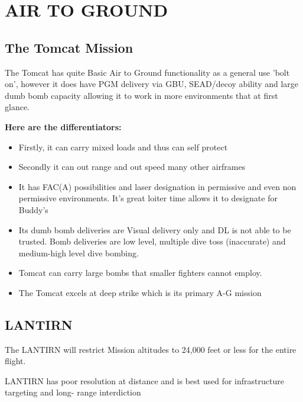 \section{AIR TO GROUND}

\subsection{The Tomcat Mission}

The Tomcat has quite Basic Air to Ground functionality as a general use 'bolt
on', however it does have PGM delivery via GBU, SEAD/decoy ability and large
dumb bomb capacity allowing it to work in more environments that at first
glance.

\textbf{Here are the differentiators:}

\begin{itemize}

  \item Firstly, it can carry mixed loads and thus can self protect

  \item Secondly it can out range and out speed many other airframes

  \item It has FAC(A) possibilities and laser designation in permissive and
    even non permissive environments. It's great loiter time allows it to
    designate for Buddy's

  \item Its dumb bomb deliveries are Visual delivery only and DL is not able to
    be trusted. Bomb deliveries are low level, multiple dive toss (inaccurate)
    and medium-high level dive bombing.

  \item Tomcat can carry large bombs that smaller fighters cannot employ.

  \item The Tomcat excels at deep strike which is its primary A-G mission

\end{itemize}

\subsection{LANTIRN}

The LANTIRN will restrict Mission altitudes to 24,000 feet or less for the
entire flight.

LANTIRN has poor resolution at distance and is best used for infrastructure
targeting and long- range interdiction

